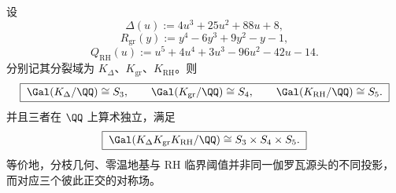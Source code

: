 \begin{theorem}\label{thm:xi-branch-rh-zero-temp-arithmetic-independence}
设
\[
\Delta(u):=4u^3+25u^2+88u+8,
\]
\[
R_{\mathrm{gr}}(y):=y^4-6y^3+9y^2-y-1,
\]
\[
Q_{\mathrm{RH}}(u):=u^5+4u^4+3u^3-96u^2-42u-14.
\]
分别记其分裂域为 \(K_\Delta\)、\(K_{\mathrm{gr}}\)、\(K_{\mathrm{RH}}\)。则
\[
\boxed{\;
\Gal(K_\Delta/\QQ)\cong S_3,\qquad
\Gal(K_{\mathrm{gr}}/\QQ)\cong S_4,\qquad
\Gal(K_{\mathrm{RH}}/\QQ)\cong S_5.\;}
\]
并且三者在 \(\QQ\) 上算术独立，满足
\[
\boxed{\;
\Gal(K_\Delta K_{\mathrm{gr}}K_{\mathrm{RH}}/\QQ)
\cong
S_3\times S_4\times S_5.\;}
\]
等价地，分枝几何、零温地基与 RH 临界阈值并非同一伽罗瓦源头的不同投影，而对应三个彼此正交的对称场。
\end{theorem}
